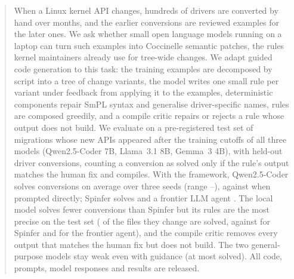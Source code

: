 \begin{abstract}
When a Linux kernel API changes, hundreds of drivers are converted by hand over months, and the earlier
conversions are reviewed examples for the later ones. We ask whether small open language models running on a
laptop can turn such examples into Coccinelle semantic patches, the rules kernel maintainers already use for
tree-wide changes. We adapt guided code generation to this task: the training examples are decomposed by script
into a tree of change variants, the model writes one small rule per variant under feedback from applying it to the
examples, deterministic components repair SmPL syntax and generalise driver-specific names, rules are composed
greedily, and a compile critic repairs or rejects a rule whose output does not build. We evaluate on a
pre-registered test set of \testMigrations{} migrations whose new APIs appeared after the training cutoffs of all
three models (Qwen2.5-Coder 7B, Llama~3.1 8B, Gemma~3 4B), with \testBuildable{} held-out driver conversions,
counting a conversion as solved only if the rule's output matches the human fix and compiles. With the framework,
Qwen2.5-Coder solves \testQwenCoderFull{} conversions on average over three seeds (range
\testQwenCoderFullMin--\testQwenCoderFullMax), against \testQwenCoderOneShot{} when prompted directly; Spinfer
solves \testSpinfer{} and a frontier LLM agent \testFrontier. The local model solves fewer conversions than
Spinfer but its rules are the most precise on the test set (\testSafeQwenCoderPrecision{} of the files they change
are solved, against \testSafeSpinferPrecision{} for Spinfer and \testSafeFrontierPrecision{} for the frontier
agent), and the compile critic removes every output that matches the human fix but does not build. The two general-purpose
models stay weak even with guidance (at most \testLlamaFullMax{} solved). All code, prompts, model responses and
results are released.
\end{abstract}
